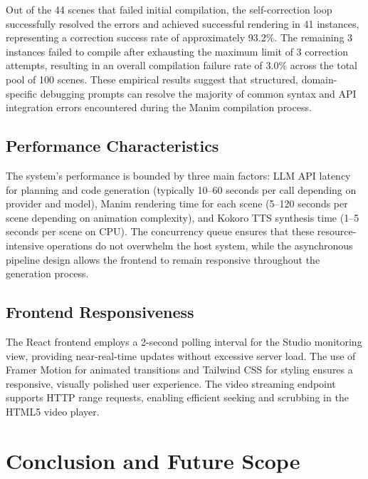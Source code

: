 \documentclass[12pt,a4paper,twoside,openright]{report}
\begin{document}
Out of the 44 scenes that failed initial compilation, the self-correction loop successfully resolved the errors and achieved successful rendering in 41 instances, representing a correction success rate of approximately 93.2\%. The remaining 3 instances failed to compile after exhausting the maximum limit of 3 correction attempts, resulting in an overall compilation failure rate of 3.0\% across the total pool of 100 scenes. These empirical results suggest that structured, domain-specific debugging prompts can resolve the majority of common syntax and API integration errors encountered during the Manim compilation process.

\section{Performance Characteristics}

The system's performance is bounded by three main factors: LLM API latency for planning and code generation (typically 10--60 seconds per call depending on provider and model), Manim rendering time for each scene (5--120 seconds per scene depending on animation complexity), and Kokoro TTS synthesis time (1--5 seconds per scene on CPU). The concurrency queue ensures that these resource-intensive operations do not overwhelm the host system, while the asynchronous pipeline design allows the frontend to remain responsive throughout the generation process.

\section{Frontend Responsiveness}

The React frontend employs a 2-second polling interval for the Studio monitoring view, providing near-real-time updates without excessive server load. The use of Framer Motion for animated transitions and Tailwind CSS for styling ensures a responsive, visually polished user experience. The video streaming endpoint supports HTTP range requests, enabling efficient seeking and scrubbing in the HTML5 video player.

\cleardoublepage


\chapter{Conclusion and Future Scope}
\end{document}
